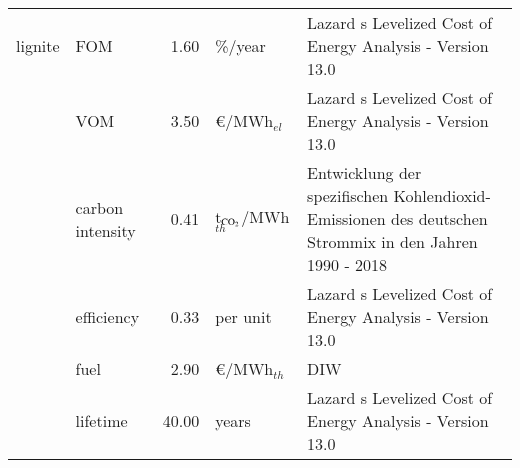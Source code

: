 \begin{longtable}{p{4cm}p{4cm}rp{3cm}p{10cm}}
lignite & FOM &         1.60 &                       \%/year &                                                                                                                                                                                                                                                                            Lazard s Levelized Cost of Energy Analysis - Version 13.0 \\
                      & VOM &         3.50 &              \euro/MWh$_{el}$ &                                                                                                                                                                                                                                                                            Lazard s Levelized Cost of Energy Analysis - Version 13.0 \\
                      & carbon intensity &         0.41 &     t$_{\ce{CO2}}$/MWh$_{th}$ &                                                                                                                                                                                                                                Entwicklung der spezifischen Kohlendioxid-Emissionen des deutschen Strommix in den Jahren 1990 - 2018 \\
                      & efficiency &         0.33 &                      per unit &                                                                                                                                                                                                                                                                            Lazard s Levelized Cost of Energy Analysis - Version 13.0 \\
                      & fuel &         2.90 &              \euro/MWh$_{th}$ &                                                                                                                                                                                                                                                                                                                                  DIW \\
                      & lifetime &        40.00 &                         years &                                                                                                                                                                                                                                                                            Lazard s Levelized Cost of Energy Analysis - Version 13.0 \\

\end{longtable}
